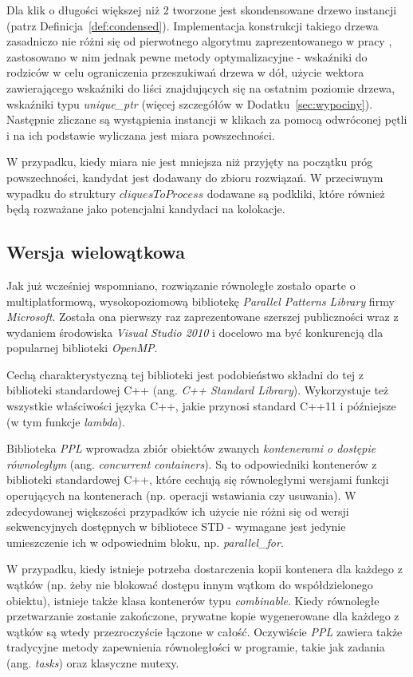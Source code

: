 \documentclass[12pt]{article}
\begin{document}
Dla klik o długości większej niż 2 tworzone jest skondensowane drzewo instancji (patrz Definicja~\ref{def:condensed}). Implementacja konstrukcji takiego drzewa zasadniczo nie różni się od pierwotnego algorytmu zaprezentowanego w pracy \cite{chinczyki}, zastosowano w nim jednak pewne metody optymalizacyjne - wskaźniki do rodziców w celu ograniczenia przeszukiwań drzewa w dół, użycie wektora zawierającego wskaźniki do liści znajdujących się na ostatnim poziomie drzewa, wskaźniki typu \textit{unique\_ptr} (więcej szczegółów w Dodatku~\ref{sec:wypociny}). Następnie zliczane są wystąpienia instancji w klikach za pomocą odwróconej pętli i na ich podstawie wyliczana jest miara powszechności.

W przypadku, kiedy miara nie jest mniejsza niż przyjęty na początku próg powszechności, kandydat jest dodawany do zbioru rozwiązań. W przeciwnym wypadku do struktury $ cliquesToProcess $ dodawane są podkliki, które również będą rozważane jako potencjalni kandydaci na kolokacje.

\subsection{Wersja wielowątkowa}

Jak już wcześniej wspomniano, rozwiązanie równoległe zostało oparte o multiplatformową, wysokopoziomową bibliotekę \textit{Parallel Patterns Library} firmy \textit{Microsoft}. Została ona pierwszy raz zaprezentowane szerszej publiczności wraz z wydaniem środowiska \textit{Visual Studio 2010} i docelowo ma być konkurencją dla popularnej biblioteki \textit{OpenMP}.

Cechą charakterystyczną tej biblioteki jest podobieństwo składni do tej z biblioteki standardowej C++ (ang. \textit{C++ Standard Library}). Wykorzystuje też wszystkie właściwości języka C++, jakie przynosi standard C++11 i późniejsze (w tym funkcje \textit{lambda}).

Biblioteka \textit{PPL} wprowadza zbiór obiektów zwanych \textit{kontenerami o dostępie równoległym} (ang. \textit{concurrent containers}). Są to odpowiedniki kontenerów z biblioteki standardowej C++, które cechują się równoległymi wersjami funkcji operujących na kontenerach (np. operacji wstawiania czy usuwania). W zdecydowanej większości przypadków ich użycie nie różni się od wersji sekwencyjnych dostępnych w bibliotece STD - wymagane jest jedynie umieszczenie ich w odpowiednim bloku, np. \textit{parallel\_for}.

W przypadku, kiedy istnieje potrzeba dostarczenia kopii kontenera dla każdego z wątków (np. żeby nie blokować dostępu innym wątkom do współdzielonego obiektu), istnieje także klasa kontenerów typu \textit{combinable}. Kiedy równoległe przetwarzanie zostanie zakończone, prywatne kopie wygenerowane dla każdego z wątków są wtedy przezroczyście łączone w całość. Oczywiście \textit{PPL} zawiera także tradycyjne metody zapewnienia równoległości w programie, takie jak zadania (ang. \textit{tasks}) oraz klasyczne mutexy.
\end{document}
